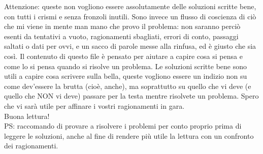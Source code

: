 Attenzione: queste non vogliono essere assolutamente delle soluzioni scritte bene, con tutti i crismi e senza fronzoli inutili. Sono invece un flusso di coscienza di ciò che mi viene in mente man mano che provo il problema: non saranno perciò esenti da tentativi a vuoto, ragionamenti sbagliati, errori di conto, passaggi saltati o dati per ovvi, e un sacco di parole messe alla rinfusa, ed è giusto che sia così. Il contenuto di questo file è pensato per aiutare a capire cosa si pensa e come lo si pensa quando si risolve un problema. Le soluzioni scritte bene sono utili a capire cosa scrivere sulla bella, queste vogliono essere un indizio non su come dev'essere la brutta (cioè, anche), ma soprattutto su quello che vi deve (e quello che NON vi deve) passare per la testa mentre risolvete un problema. Spero che vi sarà utile per affinare i vostri ragionamenti in gara. \\
Buona lettura! \\

PS: raccomando di provare a risolvere i problemi per conto proprio prima di leggere le soluzioni, anche al fine di rendere più utile la lettura con un confronto dei ragionamenti.
